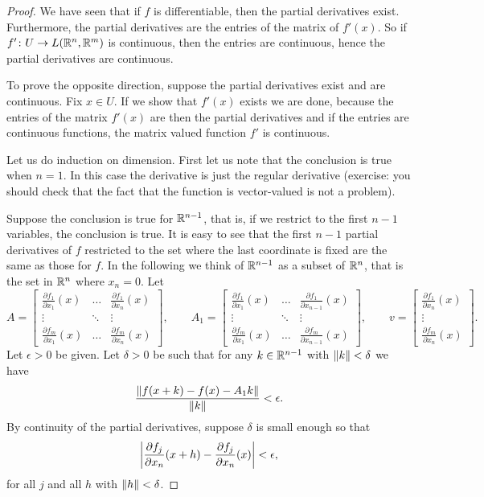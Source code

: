 \begin{proof}
We have seen that if $f$ is differentiable, then
the partial derivatives exist.  Furthermore, the partial
derivatives are the entries of the matrix of $f'(x)$.  So if
$f' \colon U \to L({\mathbb{R}}^n,{\mathbb{R}}^m)$ is continuous, then the entries are
continuous, hence the partial derivatives are continuous.

To prove the opposite direction,
suppose the partial derivatives exist and are continuous.
Fix $x \in U$.  If we show that $f'(x)$ exists we are done, because
the entries of the matrix $f'(x)$ are then the partial derivatives and if
the entries are continuous functions, the matrix valued function $f'$ is
continuous.

Let us do induction on dimension.  First let us note that
the conclusion is true when $n=1$.  In this case the derivative
is just the regular derivative (exercise: you should check that the fact
that the function is vector-valued is not a problem).

Suppose the conclusion is true for ${\mathbb{R}}^{n-1}$,
that is,
if we restrict to the first $n-1$ variables, the conclusion is true.
It is easy to see that the first $n-1$
partial derivatives of $f$ restricted to the set where the last coordinate is
fixed are the same as those for $f$.
In the following
we think of ${\mathbb{R}}^{n-1}$ as a subset of ${\mathbb{R}}^n$, that is the set in ${\mathbb{R}}^n$ where $x_n = 0$.
Let
\begin{equation*}
A = 
\begin{bmatrix}
\frac{\partial f_1}{\partial x_1}(x)
& \ldots &
\frac{\partial f_1}{\partial x_n}(x)
\\
\vdots & \ddots & \vdots
\\
\frac{\partial f_m}{\partial x_1}(x)
& \ldots &
\frac{\partial f_m}{\partial x_n}(x)
\end{bmatrix} ,
\qquad
A_1 = 
\begin{bmatrix}
\frac{\partial f_1}{\partial x_1}(x)
& \ldots &
\frac{\partial f_1}{\partial x_{n-1}}(x)
\\
\vdots & \ddots & \vdots
\\
\frac{\partial f_m}{\partial x_1}(x)
& \ldots &
\frac{\partial f_m}{\partial x_{n-1}}(x)
\end{bmatrix} ,
\qquad
v = 
\begin{bmatrix}
\frac{\partial f_1}{\partial x_n}(x)
\\
\vdots
\\
\frac{\partial f_m}{\partial x_n}(x)
\end{bmatrix} .
\end{equation*}
Let $\epsilon > 0$ be given.  Let $\delta > 0$ be such that
for any $k \in {\mathbb{R}}^{n-1}$ with $\lVert {k} \rVert < \delta$ we have
\begin{equation*}
\frac{\lVert {f(x+k) - f(x) - A_1k} \rVert}{\lVert {k} \rVert} < \epsilon .
\end{equation*}
By continuity of the partial derivatives, suppose $\delta$ is small
enough so that
\begin{equation*}
\left\lvert {\frac{\partial f_j}{\partial x_n}(x+h)
      - \frac{\partial f_j}{\partial x_n}(x)} \right\rvert < \epsilon ,
\end{equation*}
for all $j$ and all $h$ with $\lVert {h} \rVert < \delta$.


\end{proof}
